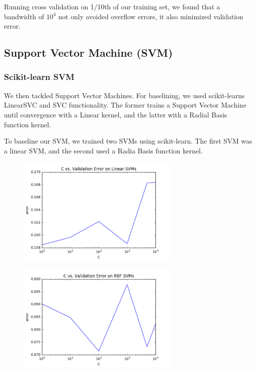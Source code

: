 \documentclass{article} %
\begin{document}
Running cross validation on 1/10th of our training set, we found that a
bandwidth of $10^4$ not only avoided overflow errors, it also minimized validation error.

\subsection{Support Vector Machine (SVM)}
\subsubsection{Scikit-learn SVM}
We then tackled Support Vector Machines. For baselining,
we used scikit-learns LinearSVC and SVC functionality. The
former trains a Support Vector Machine until convergence with
a Linear kernel, and the latter with a Radial Basis function kernel. 

To baseline our SVM, we trained two SVMs using scikit-learn. The first SVM was a
linear SVM, and the second used a Radia Basis function kernel.

\begin{figure}[h]
\centering
\includegraphics[width=0.7\textwidth]{sklearn-svm-c-cv.png}
\end{figure}

\begin{figure}[h]
\centering
\includegraphics[width=0.7\textwidth]{sklearn-svm-kernel-c-cv.png}
\end{figure}
\end{document}
